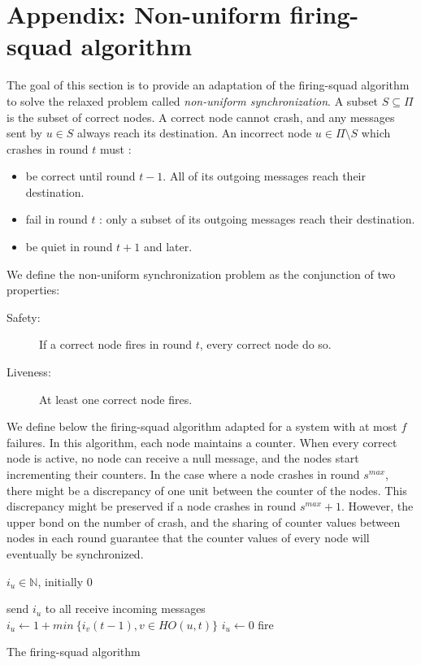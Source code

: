 \documentclass{article}
\begin{document}
\section{Appendix: Non-uniform firing-squad algorithm}

The goal of this section is to provide an adaptation of the firing-squad algorithm to solve the relaxed problem called \textit{non-uniform synchronization}.
A subset $S \subseteq \Pi$ is the subset of correct nodes.
A correct node cannot crash, and any messages sent by $u \in S$ always reach its destination.
An incorrect node $u \in \Pi \setminus S$ which crashes in round $t$ must :
\begin{itemize}
	\item be correct until round $t-1$. All of its outgoing messages reach their destination.
	\item fail in round $t$ : only a subset of its outgoing messages reach their destination.
	\item be quiet in round $t+1$ and later.
\end{itemize}

We define the non-uniform synchronization problem as the conjunction of two properties:
\begin{description}
	\item[Safety:] If a correct node fires in round $t$, every correct node do so.
	\item[Liveness:] At least one correct node fires.
\end{description}

\noindent We define below the firing-squad algorithm adapted for a system with at most $f$ failures.
In this algorithm, each node maintains a counter. When every correct node is active, no node can receive a null message, and the nodes start incrementing their counters.
In the case where a node crashes in round $s^{max}$, there might be a discrepancy of one unit between the counter of the nodes.
This discrepancy might be preserved if a node crashes in round $s^{max}+1$.
However, the upper bond on the number of crash, and the sharing of counter values between nodes in each round guarantee that the counter values of every node will eventually be synchronized.

\begin{algorithm}[htb]\label{algo:code}
\begin{distribalgo}[1]
\BLANK {}
	\STATE $i_u \in \mathds{N}$, initially 0

\ENDINDENT \BLANK

	\STATE send $i_u$ to all
	\STATE receive incoming messages
		\STATE $i_u \leftarrow 1+min~\{i_v(t-1), v \in HO(u,t)\}$ \label{line:union}
	\ELSE
		\STATE $i_u \leftarrow 0$
	\ENDIF
		\STATE fire
	\ENDIF
\ENDINDENT
\caption{The firing-squad algorithm} \label{algo:R}
\end{distribalgo}

\end{algorithm}
\end{document}
